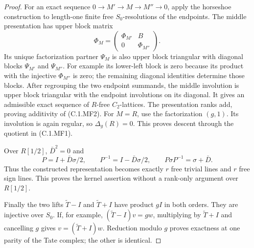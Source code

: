 \begin{proof}
For an exact sequence $0\to M'\to M\to M''\to0$,
apply the horseshoe construction to length-one finite
free $S_0$-resolutions of the endpoints.
The middle presentation has upper block matrix
\[
 \Phi_M=\begin{pmatrix}\Phi_{M'}&B\\0&\Phi_{M''}\end{pmatrix}.
\]
Its unique factorization partner $\Psi_M$ is also upper
block triangular with diagonal blocks $\Psi_{M'}$ and
$\Psi_{M''}$.
For example its lower-left block is zero because its
product with the injective $\Phi_{M''}$ is zero;
the remaining diagonal identities determine those blocks.
After regrouping the two endpoint summands, the middle
involution is upper block triangular with the endpoint
involutions on its diagonal.
It gives an admissible exact sequence of $R$-free
$C_2$-lattices.
The presentation ranks add, proving additivity of
(C.1.MF2).
For $M=R$, use the factorization $(g,1)$.
Its involution is again regular, so $\Delta_g(R)=0$.
This proves descent through the quotient in (C.1.MF1).

Over $R[1/2]$, $\bar D^2=0$ and
\[
 P=I+\bar D\sigma/2,
 \qquad P^{-1}=I-\bar D\sigma/2,
 \qquad P\sigma P^{-1}=\sigma+\bar D.
\]
Thus the constructed representation becomes exactly
$r$ free trivial lines and $r$ free sign lines.
This proves the kernel assertion without a rank-only
argument over $R[1/2]$.

Finally the two lifts $\widetilde T-I$ and
$\widetilde T+I$ have product $gI$ in both orders.
They are injective over $S_0$.
If, for example, $(\widetilde T-I)v=gw$, multiplying
by $\widetilde T+I$ and cancelling $g$ gives
$v=(\widetilde T+I)w$.
Reduction modulo $g$ proves exactness at one parity
of the Tate complex; the other is identical.
\end{proof}

